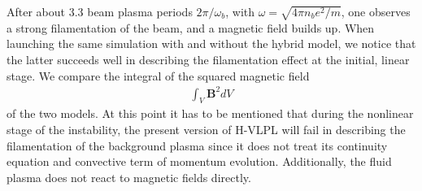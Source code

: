 \documentclass[conference]{IEEEtran}
\renewcommand{\~}{\widetilde }
\begin{document}
After about 3.3 beam plasma periods $2\pi / \omega_b$, with $\omega =
\sqrt{4\pi n_b e^2/m}$, one observes a strong filamentation of the
beam, and a magnetic field builds up. When launching the same
simulation with and without the hybrid model, we notice that the
latter succeeds well in describing the filamentation effect at the
initial, linear stage. We compare the integral of the squared magnetic field
\begin{align*}
\int_{V} \textbf{B}^2 dV
\end{align*}
of the two models. At this point it has to be mentioned that during the nonlinear stage of the instability, the present version of H-VLPL will fail in describing the filamentation of the background plasma since it does not treat its continuity equation and convective term of momentum evolution. Additionally, the fluid plasma does not react to magnetic fields directly. \newline 

\end{document}
